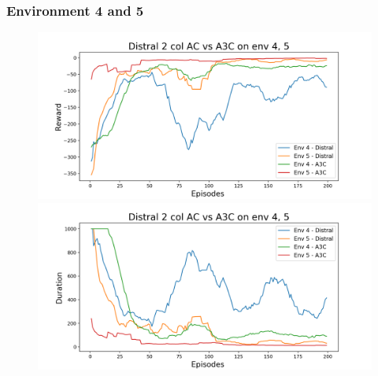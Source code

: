 \documentclass[12pt]{report}
\begin{document}
\subsubsection{Environment 4 and 5}
\begin{figure}[H]
\centering
\begin{minipage}{.5\textwidth}
\centering
\includegraphics[width=\textwidth]{figs/d2_col_ac/d2_col_ac_4_5_rwd.png}
\end{minipage}%
\centering
\begin{minipage}{.5\textwidth}
\centering
\includegraphics[width=\textwidth]{figs/d2_col_ac/d2_col_ac_4_5_dur.png}
\end{minipage}%
\end{figure}
\end{document}
